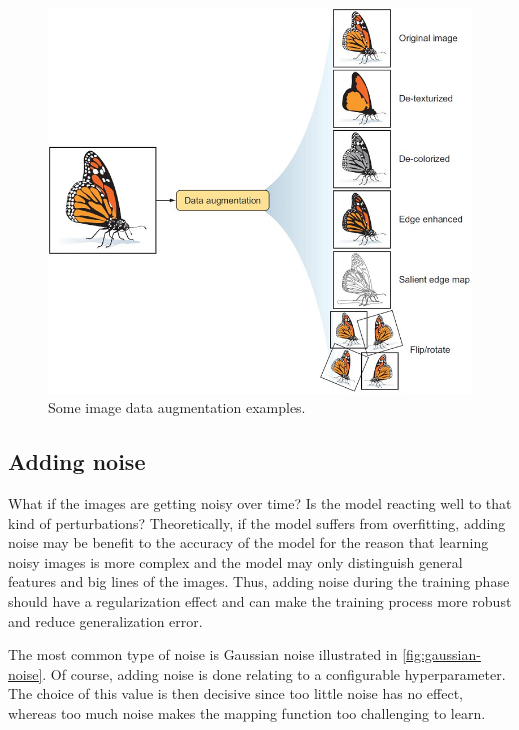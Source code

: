 \documentclass[11pt, openany]{report}
\theoremstyle{plain}
\theoremstyle{definition}
\theoremstyle{remark}
\begin{document}
\begin{figure}[H]
  \centering
  \includegraphics[scale=0.55]{figures/data_augmentation.png}
  \caption{Some image data augmentation examples.}
  \label{fig:dropout}
\end{figure}


\subsection{Adding noise}
What if the images are getting noisy over time? Is the model reacting well to that kind of perturbations? Theoretically, if the model suffers from overfitting, adding noise may be benefit to the accuracy of the model for the reason that learning noisy images is more complex and the model may only distinguish general features and big lines of the images.
Thus, adding noise during the training phase should have a regularization effect and can make the training process more robust and reduce generalization error. 

The most common type of noise is Gaussian noise illustrated in \autoref{fig:gaussian-noise}. Of course, adding noise is done relating to a configurable hyperparameter. The choice of this value is then decisive since too little noise has no effect, whereas too much noise makes the mapping function too challenging to learn. 
\end{document}
